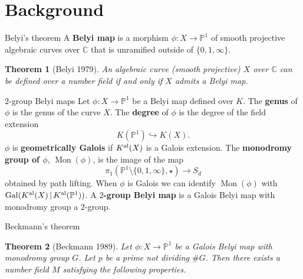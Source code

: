 \documentclass[xcolor=dvipsnames]{beamer}
\theoremstyle{plain}
\newtheorem*{thm}{Theorem}
\newcommand{\PP}{\mathbb P}
\newcommand{\CC}{\mathbb C}
\newcommand{\Kal}{{{K}^{\textup{al}}}}
\DeclareMathOperator{\Mon}{Mon}
\DeclareMathOperator{\Gal}{Gal}
\begin{document}
  \section{Background}{
    \begin{frame}{Belyi's theorem}
      A \textbf{Belyi map}
      is a morphism
      $\phi\colon X\to\PP^1$
      of smooth projective algebraic curves
      over $\CC$
      that is unramified outside of
      $\{0,1,\infty\}$.
      \pause
      \begin{thm}[Belyi 1979]
        \vspace{1pt}
        An algebraic curve (smooth projective)
        $X$ over $\CC$ can be defined over a number
        field if and only if $X$ admits a
        Belyi map.
      \end{thm}
    \end{frame}
    \begin{frame}{$2$-group Belyi maps}
      Let $\phi\colon X\to\PP^1$ be a Belyi map
      defined over $K$.
      \pause\newline
      The \textbf{genus} of $\phi$ is the genus
      of the curve $X$.
      \pause\newline
      The \textbf{degree} of $\phi$
      is the degree of the field extension
      \[
        K(\PP^1)\hookrightarrow K(X).
      \]
      \pause
      $\phi$ is \textbf{geometrically Galois}
      if $\Kal(X)$ is a Galois extension.
      \pause\newline
      The \textbf{monodromy group of $\phi$},
      $\Mon(\phi)$,
      is the image of the map
      \[
        \pi_1(\PP^1\setminus\{0,1,\infty\},\star)
        \to S_d
      \]
      obtained by path lifting.
      \pause\newline
      When $\phi$ is Galois we
      can identify $\Mon(\phi)$ with
      $\Gal(\Kal(X)\,|\,\Kal(\PP^1))$.
      \pause\newline
      A \textbf{$2$-group Belyi map} is a
      Galois Belyi map with monodromy group
      a $2$-group.
    \end{frame}
    \begin{frame}{Beckmann's theorem}
      \begin{thm}[Beckmann 1989]
        \vspace{1pt}
        Let $\phi\colon X\to\PP^1$ be a Galois
        Belyi map with monodromy group $G$.
        Let $p$ be a prime not dividing
        $\#G$.
        \pause\newline
        Then there exists a number field $M$
        satisfying the following properties.

\end{thm}
\end{frame}}
\end{document}
